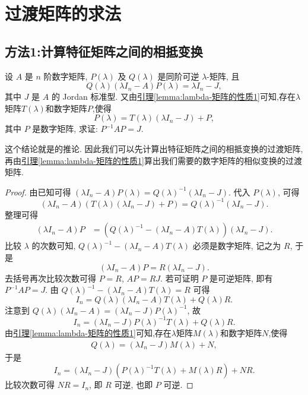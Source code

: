 \documentclass[../../main.tex]{subfiles}
\begin{document}
\section{过渡矩阵的求法}\label{section:过渡矩阵的求法}

\subsection{方法1:计算特征矩阵之间的相抵变换}

\begin{corollary}\label{proposition:两个数字矩阵相似当且仅当它们的特征矩阵作为}
设 $A$ 是 $n$ 阶数字矩阵, $P(\lambda)$ 及 $Q(\lambda)$ 是同阶可逆 $\lambda$-矩阵, 且
\[
Q(\lambda)(\lambda I_n - A)P(\lambda) = \lambda I_n - J,
\]
其中 $J$ 是 $A$ 的 Jordan 标准型. 又由\hyperref[lemma:lambda-矩阵的性质1]{引理\ref{lemma:lambda-矩阵的性质1}}可知,存在$\lambda$矩阵$T(\lambda)$和数字矩阵$P$,使得
\[
P(\lambda) = T(\lambda)(\lambda I_n - J) + P,
\]
其中 $P$ 是数字矩阵, 求证: $P^{-1}AP = J$.
\end{corollary}
\begin{remark}
这个结论就是的推论. 因此我们可以先计算出特征矩阵之间的相抵变换的过渡矩阵,再由\hyperref[lemma:lambda-矩阵的性质1]{引理\ref{lemma:lambda-矩阵的性质1}}算出我们需要的数字矩阵的相似变换的过渡矩阵.
\end{remark}
\begin{proof}
由已知可得 $(\lambda I_n - A)P(\lambda) = Q(\lambda)^{-1}(\lambda I_n - J)$. 代入 $P(\lambda)$, 可得
\[
(\lambda I_n - A)(T(\lambda)(\lambda I_n - J) + P) = Q(\lambda)^{-1}(\lambda I_n - J).
\]
整理可得
\begin{align*}
(\lambda I_n - A)P &= \left(Q(\lambda)^{-1} - (\lambda I_n - A)T(\lambda)\right)(\lambda I_n - J).
\end{align*}
比较 $\lambda$ 的次数可知, $Q(\lambda)^{-1} - (\lambda I_n - A)T(\lambda)$ 必须是数字矩阵, 记之为 $R$, 于是
\[
(\lambda I_n - A)P = R(\lambda I_n - J).
\]
去括号再次比较次数可得 $P = R$, $AP = RJ$. 若可证明 $P$ 是可逆矩阵, 即有 $P^{-1}AP = J$. 由 $Q(\lambda)^{-1} - (\lambda I_n - A)T(\lambda) = R$ 可得
\[
I_n = Q(\lambda)(\lambda I_n - A)T(\lambda) + Q(\lambda)R.
\]
注意到 $Q(\lambda)(\lambda I_n - A) = (\lambda I_n - J)P(\lambda)^{-1}$, 故
\[
I_n = (\lambda I_n - J)P(\lambda)^{-1}T(\lambda) + Q(\lambda)R.
\]
由\hyperref[lemma:lambda-矩阵的性质1]{引理\ref{lemma:lambda-矩阵的性质1}}可知,存在$\lambda$矩阵$M(\lambda)$和数字矩阵$N$,使得
\begin{align*}
Q(\lambda) = (\lambda I_n - J)M(\lambda) + N,
\end{align*}
于是
\[
I_n = (\lambda I_n - J)\left(P(\lambda)^{-1}T(\lambda) + M(\lambda)R\right) + NR.
\]
比较次数可得 $NR = I_n$, 即 $R$ 可逆, 也即 $P$ 可逆. 
\end{proof}
\end{document}
